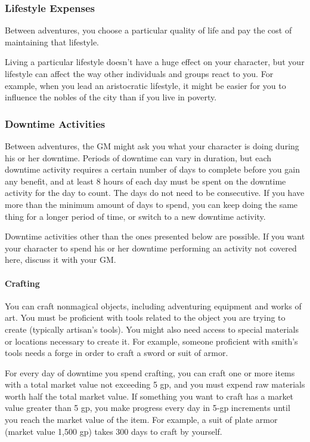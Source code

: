 \documentclass[
]{article}
\begin{document}
\hypertarget{lifestyle-expenses}{%
\subsubsection{Lifestyle Expenses}\label{lifestyle-expenses}}

Between adventures, you choose a particular quality of life and pay the
cost of maintaining that lifestyle.

Living a particular lifestyle doesn't have a huge effect on your
character, but your lifestyle can affect the way other individuals and
groups react to you. For example, when you lead an aristocratic
lifestyle, it might be easier for you to influence the nobles of the
city than if you live in poverty.

\hypertarget{downtime-activities}{%
\subsubsection{Downtime Activities}\label{downtime-activities}}

Between adventures, the GM might ask you what your character is doing
during his or her downtime. Periods of downtime can vary in duration,
but each downtime activity requires a certain number of days to complete
before you gain any benefit, and at least 8 hours of each day must be
spent on the downtime activity for the day to count. The days do not
need to be consecutive. If you have more than the minimum amount of days
to spend, you can keep doing the same thing for a longer period of time,
or switch to a new downtime activity.

Downtime activities other than the ones presented below are possible. If
you want your character to spend his or her downtime performing an
activity not covered here, discuss it with your GM.

\hypertarget{crafting}{%
\paragraph{Crafting}\label{crafting}}

You can craft nonmagical objects, including adventuring equipment and
works of art. You must be proficient with tools related to the object
you are trying to create (typically artisan's tools). You might also
need access to special materials or locations necessary to create it.
For example, someone proficient with smith's tools needs a forge in
order to craft a sword or suit of armor.

For every day of downtime you spend crafting, you can craft one or more
items with a total market value not exceeding 5 gp, and you must expend
raw materials worth half the total market value. If something you want
to craft has a market value greater than 5 gp, you make progress every
day in 5-gp increments until you reach the market value of the item. For
example, a suit of plate armor (market value 1,500 gp) takes 300 days to
craft by yourself.
\end{document}
